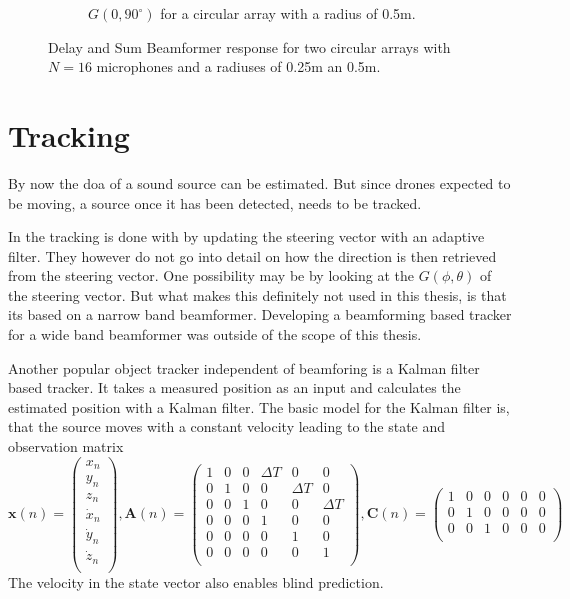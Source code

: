 \begin{figure}[h]
\begin{subfigure}[t]{0.45\textwidth}
		\caption{$G(0, 90^\circ)$ for a circular array with a radius of 0.5m.}
		\label{ssl:fig:f_dep1}
	\end{subfigure}
	\caption{Delay and Sum Beamformer response for two circular arrays with $N=16$ microphones
		and a radiuses of 0.25m an 0.5m. }
	\label{ssl:fig:f_deps}
\end{figure}
\section{Tracking}
By now the \acrshort{doa} of a sound source can be estimated.
But since drones expected to be moving, a source once it has been
detected, needs to be tracked.

In \cite{GuiAhmad} the tracking is done with by
updating the steering vector with an adaptive filter.
They however do not go into detail on how the direction is then
retrieved from the steering vector.
One possibility may be by looking at the $G(\phi, \theta)$ of the steering vector.
But what makes this definitely not used in this thesis, is that its based on a
narrow band beamformer.
Developing a beamforming based tracker for a wide band beamformer was outside of the
scope of this thesis.

Another popular object tracker independent of beamforing is a Kalman filter based tracker.
It takes a measured position as an input and calculates the estimated position with
a Kalman filter.
The basic model for the Kalman filter is, that the source moves with a constant velocity leading to
the state and observation matrix
\begin{equation*}
	\bm{x}(n) =
	\begin{pmatrix}
		x_n       \\
		y_n       \\
		z_n       \\
		\dot{x}_n \\
		\dot{y}_n \\
		\dot{z}_n \\
	\end{pmatrix},
	\bm{A}(n) =
	\begin{pmatrix}
		1 & 0 & 0 & \Delta T & 0        & 0        \\
		0 & 1 & 0 & 0        & \Delta T & 0        \\
		0 & 0 & 1 & 0        & 0        & \Delta T \\
		0 & 0 & 0 & 1        & 0        & 0        \\
		0 & 0 & 0 & 0        & 1        & 0        \\
		0 & 0 & 0 & 0        & 0        & 1        \\
	\end{pmatrix},
	\bm{C}(n) =
	\begin{pmatrix}
		1 & 0 & 0 & 0 & 0 & 0 \\
		0 & 1 & 0 & 0 & 0 & 0 \\
		0 & 0 & 1 & 0 & 0 & 0 \\
	\end{pmatrix}
\end{equation*}
The velocity in the state vector also enables blind prediction.

